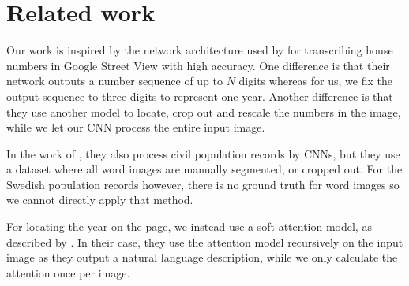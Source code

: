 
\section{Related work}

Our work is inspired by the network architecture used by \textcite{multidigit_streetview} for transcribing house numbers in Google Street View with high accuracy. One difference is that their network outputs a number sequence of up to $N$ digits whereas for us, we fix the output sequence to three digits to represent one year. Another difference is that they use another model to locate, crop out and rescale the numbers in the image, while we let our CNN process the entire input image.

In the work of \textcite{FornesCnnCategorization}, they also process civil population records by CNNs, but they use a dataset where all word images are manually segmented, or cropped out. For the Swedish population records however, there is no ground truth for word images so we cannot directly apply that method.

For locating the year on the page, we instead use a soft attention model, as described by \textcite{AttendAndTell}. In their case, they use the attention model recursively on the input image as they output a natural language description, while we only calculate the attention once per image.
